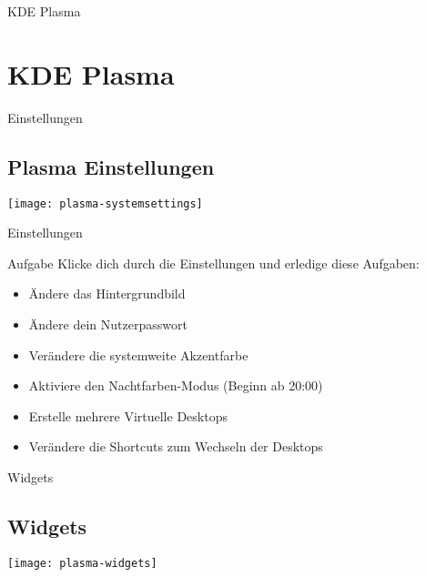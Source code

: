 
\begin{frame}{KDE Plasma}
    \section{KDE Plasma}\label{sec:KDE-Plasma}
\end{frame}

\begin{frame}{Einstellungen}
    \subsection{Plasma Einstellungen}\label{subsec:plasma-einstellungen}
    \texttt{[image: plasma-systemsettings]}
\end{frame}

\begin{frame}{Einstellungen}

    \vspace{0.5cm}
    \begin{alertblock}{Aufgabe}
        \pause
        Klicke dich durch die Einstellungen und erledige diese Aufgaben:

        \pause
        \begin{itemize}
            \item Ändere das Hintergrundbild\pause
            \item Ändere dein Nutzerpasswort\pause
            \item Verändere die systemweite Akzentfarbe\pause
            \item Aktiviere den Nachtfarben-Modus (Beginn ab 20:00)\pause
            \item Erstelle mehrere Virtuelle Desktops\pause
            \item Verändere die Shortcuts zum Wechseln der Desktops
        \end{itemize}
    \end{alertblock}
\end{frame}

\begin{frame}{Widgets}
    \subsection{Widgets}\label{subsec:widgets}
    \texttt{[image: plasma-widgets]}
\end{frame}

